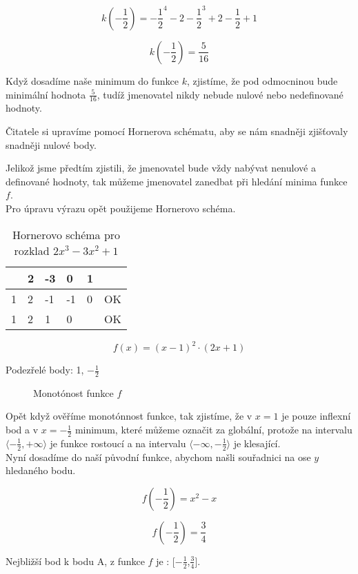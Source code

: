 \begin{displaymath}
k(-\frac{1}{2})=-\frac{1}{2}^4 -2-\frac{1}{2}^3 + 2-\frac{1}{2} + 1
\end{displaymath}

\begin{displaymath}
k(-\frac{1}{2})=\frac{5}{16}
\end{displaymath}

Když dosadíme naše minimum do funkce \(k\), zjistíme, že pod odmocninou bude minimální hodnota \(\frac{5}{16}\), tudíž jmenovatel nikdy nebude nulové nebo nedefinované hodnoty.

Čitatele si upravíme pomocí Hornerova schématu, aby se nám snadněji zjišťovaly snadněji nulové body.

Jelikož jsme předtím zjistili, že jmenovatel bude vždy nabývat nenulové a definované hodnoty, 
tak můžeme jmenovatel zanedbat při hledání minima funkce \(f\).\\

Pro úpravu výrazu opět použijeme Hornerovo schéma.

\begin{table}[!h]
\centering
\begin{tabular}{l||l|l|l|l|l}
	 & 2 & -3 &  0 & 1 &    \\ \hline\hline
   1 & 2 & -1 & -1 & 0 & OK \\ \hline
   1 & 2 &  1 &  0 &   & OK \\
\end{tabular}
\caption{Hornerovo schéma pro rozklad $2x^3 - 3x^2 + 1$}
\end{table}

\begin{displaymath}
f(x)=(x-1)^2\cdot (2x +1)
\end{displaymath}

Podezřelé body: 1, \(-\frac{1}{2}\)

\begin{figure}[H]
	\centering
	
	\caption{Monotónost funkce \(f\)}
\end{figure}

Opět když ověříme monotónnost funkce, tak zjistíme, že v $x=1$ je pouze inflexní bod a v $x=-\frac{1}{2}$ minimum, 
které můžeme označit za globální, protože na intervalu \(\langle-\frac{1}{2},+\infty\rangle\) je funkce rostoucí 
a na intervalu \(\langle-\infty,-\frac{1}{2}\rangle\) je klesající.\\
Nyní dosadíme do naší původní funkce, abychom našli souřadnici na ose \(y\) hledaného bodu.

\begin{displaymath}
f(-\frac{1}{2})= x^2 - x
\end{displaymath}

\begin{displaymath}
f(-\frac{1}{2})= \frac{3}{4}
\end{displaymath}

Nejbližší bod k bodu A, z funkce \(f\) je : [\(-\frac{1}{2}\),\(\frac{3}{4}\)].
